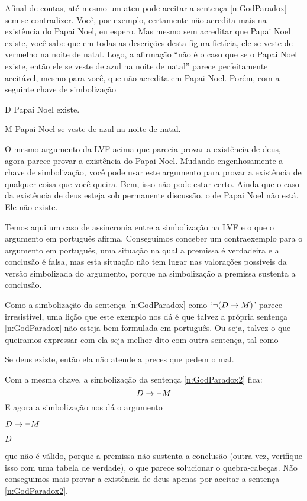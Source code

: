 Afinal de contas, até mesmo um ateu pode aceitar a sentença \ref{n:GodParadox} sem se contradizer.
Você, por exemplo, certamente não acredita mais na existência do Papai Noel, eu espero.
Mas mesmo sem acreditar que Papai Noel existe, você sabe que em todas as descrições desta figura fictícia, ele se veste de vermelho na noite de natal.
Logo, a afirmação ``não é o caso que se o Papai Noel existe, então ele se veste de azul na noite de natal'' parece perfeitamente aceitável, mesmo para você, que não acredita em Papai Noel.
Porém, com a seguinte chave de simbolização
\begin{ekey}
	\item[D] Papai Noel existe.
	\item[M] Papai Noel se veste de azul na noite de natal.
\end{ekey}
O mesmo argumento da LVF acima que parecia provar a existência de deus, agora parece provar a existência do Papai Noel.
Mudando engenhosamente a chave de simbolização, você pode usar este argumento para provar a existência de qualquer coisa que você queira.
Bem, isso não pode estar certo.
Ainda que o caso da existência de deus esteja sob permanente discussão, o de Papai Noel não está. Ele não existe. %

Temos aqui um caso de assincronia entre a simbolização na LVF e o que o argumento em português afirma.
Conseguimos conceber um contraexemplo para o argumento em português, uma situação na qual a premissa é verdadeira e a conclusão é falsa, mas esta situação não tem lugar nas valorações possíveis da versão simbolizada do argumento, porque na simbolização a premissa sustenta a conclusão.

Como a simbolização da sentença \ref{n:GodParadox} como `$\neg (D \rightarrow M)$' parece irresistível, uma lição que este exemplo nos dá é que talvez a própria sentença \ref{n:GodParadox} não esteja bem formulada em português.
Ou seja, talvez o que queiramos expressar com ela seja melhor dito com outra sentença, tal como
        	\begin{earg}
                  \setcounter{eargnum}{3}	
                \item\label{n:GodParadox2} Se deus existe, então ela não atende a preces que pedem o mal.
  \end{earg}
Com a mesma chave, a simbolização da sentença \ref{n:GodParadox2} fica:
$$D \rightarrow \neg M$$
E agora a simbolização nos dá o argumento
	\begin{earg}
		\item[] $D \rightarrow \neg M$
		\item[\therefore] $D$
	\end{earg}
que não é válido, porque a premissa não sustenta a conclusão (outra vez, verifique isso com uma tabela de verdade), o que parece solucionar o quebra-cabeças.
Não conseguimos mais provar a existência de deus apenas por aceitar a sentença  \ref{n:GodParadox2}.

